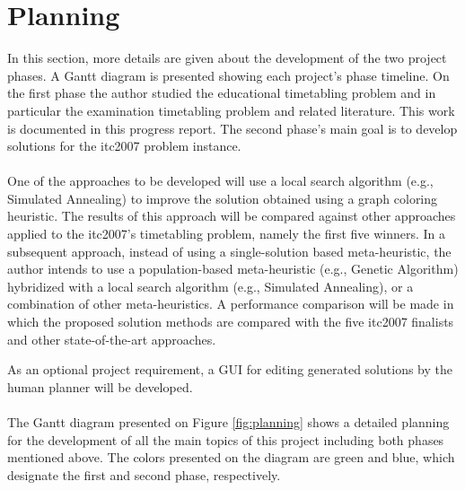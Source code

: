 
\section{Planning}

In this section, more details are given about the development of the two project phases. A Gantt diagram is presented showing each project's phase timeline. On the first phase the author studied the educational timetabling problem and in particular the examination timetabling problem and related literature. This work is documented in this progress report. The second phase's main goal is to develop solutions for the \gls{itc2007} problem instance. \\
\\
One of the approaches to be developed will use a local search algorithm (e.g., Simulated Annealing) to improve the solution obtained using a graph coloring heuristic. The results of this approach will be compared against other approaches applied to the \gls{itc2007}’s timetabling problem, namely the first five winners. In a subsequent approach, instead of using a single-solution based meta-heuristic, the author intends to use a population-based meta-heuristic (e.g., Genetic Algorithm) hybridized with a local
search algorithm (e.g., Simulated Annealing), or a combination of other meta-heuristics. A performance comparison will be made in which the proposed solution methods are compared with the five \gls{itc2007} finalists and other state-of-the-art approaches. 

As an optional project requirement, a GUI for editing generated solutions by the human planner will be developed.\\
\\
The Gantt diagram presented on Figure \ref{fig:planning} shows a detailed planning for the development of all the main topics of this project including both phases mentioned above. The colors presented on the diagram are green and blue, which designate the first and second phase, respectively.\\


